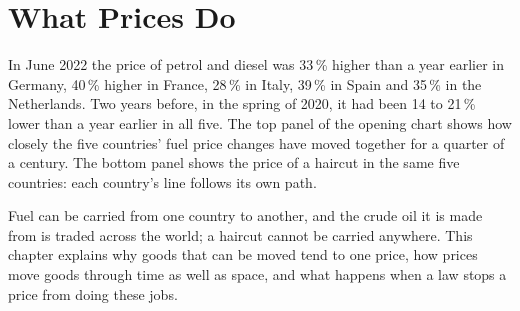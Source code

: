 \chapter{What Prices Do}\label{ch:g10:what-prices-do}

In June 2022 the price of petrol and diesel was 33\,\% higher than a year earlier in Germany, 40\,\% higher in France, 28\,\% in
Italy, 39\,\% in Spain and 35\,\% in the Netherlands. Two years before, in the spring of 2020, it had been 14 to 21\,\% lower than a
year earlier in all five. The top panel of the opening chart shows how closely the five countries' fuel price changes have moved
together for a quarter of a century. The bottom panel shows the price of a haircut in the same five countries: each country's line follows its
own path.

Fuel can be carried from one country to another, and the crude oil it is made from is traded across the world; a haircut cannot be
carried anywhere. This chapter explains why goods that can be moved tend to one price, how prices move goods through time as well as
space, and what happens when a law stops a price from doing these jobs.

